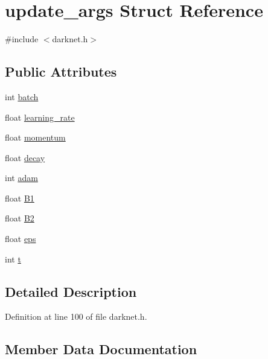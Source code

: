 \hypertarget{structupdate__args}{}\section{update\+\_\+args Struct Reference}
\label{structupdate__args}


{\ttfamily \#include $<$darknet.\+h$>$}

\subsection*{Public Attributes}
\begin{DoxyCompactItemize}
\item 
int \mbox{\hyperlink{structupdate__args_a1accceb722234c5aa3f38cc85c1d7cf7}{batch}}
\item 
float \mbox{\hyperlink{structupdate__args_a3a0145d580360b2ffae2879af7e68c67}{learning\+\_\+rate}}
\item 
float \mbox{\hyperlink{structupdate__args_abc35ad880888473f137cb9744e874870}{momentum}}
\item 
float \mbox{\hyperlink{structupdate__args_a9eb5a4b5663dca4b69a13a19da674f19}{decay}}
\item 
int \mbox{\hyperlink{structupdate__args_ab246da6c016ed395f727ab4f12df6e7d}{adam}}
\item 
float \mbox{\hyperlink{structupdate__args_a1822b0d844c349135590f3583415faec}{B1}}
\item 
float \mbox{\hyperlink{structupdate__args_ad4542261082ee829820f2d6a750021f6}{B2}}
\item 
float \mbox{\hyperlink{structupdate__args_a7a173936c93e7424d77347cfa9ab3f2f}{eps}}
\item 
int \mbox{\hyperlink{structupdate__args_addc09d90e7323fc19a4e04b0612ef10b}{t}}
\end{DoxyCompactItemize}


\subsection{Detailed Description}


Definition at line 100 of file darknet.\+h.



\subsection{Member Data Documentation}
\mbox{\label{structupdate__args_ab246da6c016ed395f727ab4f12df6e7d}} 
